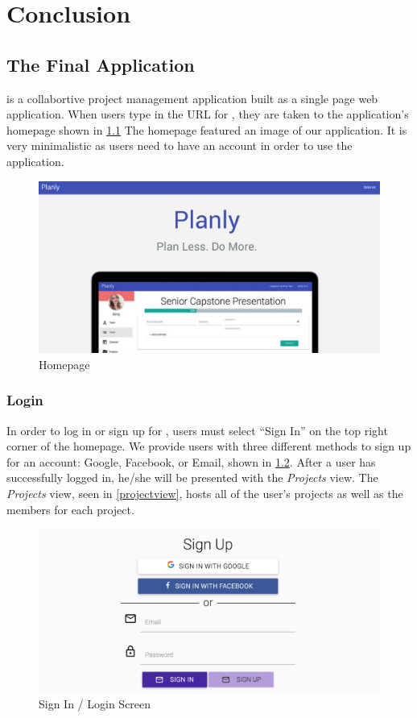 \chapter{Conclusion}

\section{The Final Application}
\projectTitle is a collabortive project management application built as a single page web application. When users type in the URL for \projectTitle, they are taken to the application's homepage shown in \ref{homepage} The homepage featured an image of our application. It is very minimalistic as users need to have an account in order to use the application.

\begin{figure}[ht]
\centering
\includegraphics[width=\textwidth]{figure41.png}
\caption{Homepage}
\label{homepage}
\end{figure}
\FloatBarrier

\subsection{Login}
In order to log in or sign up for \projectTitle, users must select ``Sign In'' on the top right corner of the homepage. We provide users with three different methods to sign up for an account: Google, Facebook, or Email, shown in \ref{signin}. After a user has successfully logged in, he/she will be presented with the \emph{Projects} view. The \emph{Projects} view, seen in \ref{projectview}, hosts all of the user's projects as well as the members for each project. 

\begin{figure}[ht]
\centering
\includegraphics[width=\textwidth]{figure42.png}
\caption{Sign In / Login Screen}
\label{signin}
\end{figure}
\FloatBarrier

